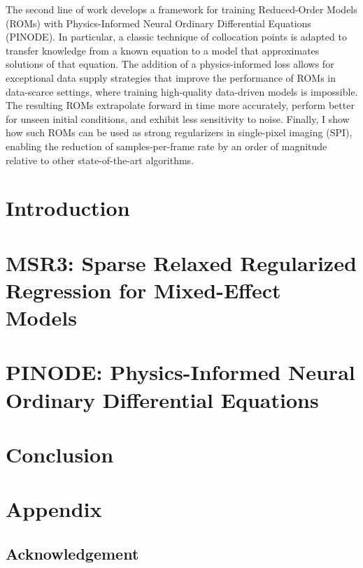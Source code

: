 \documentclass[12pt,a4paper]{book}
\numberwithin{equation}{section} %
\numberwithin{figure}{section} %
\numberwithin{table}{section} %
\begin{document}
The second line of work develops a framework for training Reduced-Order Models (ROMs) with Physics-Informed Neural Ordinary Differential Equations (PINODE). In particular, a classic technique of collocation points is adapted to transfer knowledge from a known equation to a model that approximates solutions of that equation. The addition of a physics-informed loss allows for exceptional data supply strategies that improve the performance of ROMs in data-scarce settings, where training high-quality data-driven models is impossible. The resulting ROMs extrapolate forward in time more accurately, perform better for unseen initial conditions, and exhibit less sensitivity to noise. Finally, I show how such ROMs can be used as strong regularizers in single-pixel imaging (SPI), enabling the reduction of samples-per-frame rate by an order of magnitude relative to other state-of-the-art algorithms.

\tableofcontents

\chapter{Introduction}


\chapter{MSR3: Sparse Relaxed Regularized Regression for Mixed-Effect Models}
\label{ch:msr3}


\chapter{PINODE: Physics-Informed Neural Ordinary Differential Equations}
\label{ch:pinode}




\chapter{Conclusion}





\clearpage

\appendix
\chapter{Appendix}
\section{Acknowledgement}

\end{document}
